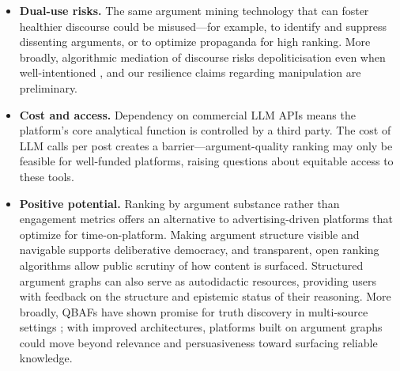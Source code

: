 \begin{itemize}[leftmargin=*,nosep]
\item \textbf{Dual-use risks.} The same argument mining technology that can foster healthier discourse could be misused---for example, to identify and suppress dissenting arguments, or to optimize propaganda for high ranking. More broadly, algorithmic mediation of discourse risks depoliticisation even when well-intentioned \citep{oleart-palomo-2025-technosolutionism}, and our resilience claims regarding manipulation are preliminary.

\item \textbf{Cost and access.} Dependency on commercial LLM APIs means the platform's core analytical function is controlled by a third party. The cost of LLM calls per post creates a barrier---argument-quality ranking may only be feasible for well-funded platforms, raising questions about equitable access to these tools.

\item \textbf{Positive potential.} Ranking by argument substance rather than engagement metrics offers an alternative to advertising-driven platforms that optimize for time-on-platform. Making argument structure visible and navigable supports deliberative democracy, and transparent, open ranking algorithms allow public scrutiny of how content is surfaced. Structured argument graphs can also serve as autodidactic resources, providing users with feedback on the structure and epistemic status of their reasoning. More broadly, QBAFs have shown promise for truth discovery in multi-source settings \citep{potyka-booth-2022-td-qbaf}; with improved architectures, platforms built on argument graphs could move beyond relevance and persuasiveness toward surfacing reliable knowledge.

\end{itemize}
